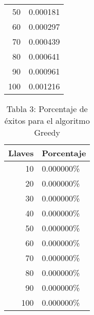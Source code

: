 \documentclass[a4paper]{article}
\begin{document}
\begin{center}
\begin{table}[ht]
\begin{tabular}{r|l}
50&0.000181\\
60&0.000297\\
70&0.000439\\
80&0.000641\\
90&0.000961\\
100&0.001216\\
\end{tabular}
\end{table}
\begin{table}[ht]
\centering
\caption*{Tabla 3: Porcentaje de \'exitos para el algoritmo Greedy}
\label{4}
\begin{tabular}{r|l}
Llaves & Porcentaje \\ \hline
10&0.000000\%\\
20&0.000000\%\\
30&0.000000\%\\
40&0.000000\%\\
50&0.000000\%\\
60&0.000000\%\\
70&0.000000\%\\
80&0.000000\%\\
90&0.000000\%\\
100&0.000000\%\\
\end{tabular}
\end{table}
\end{center}
\end{document}
